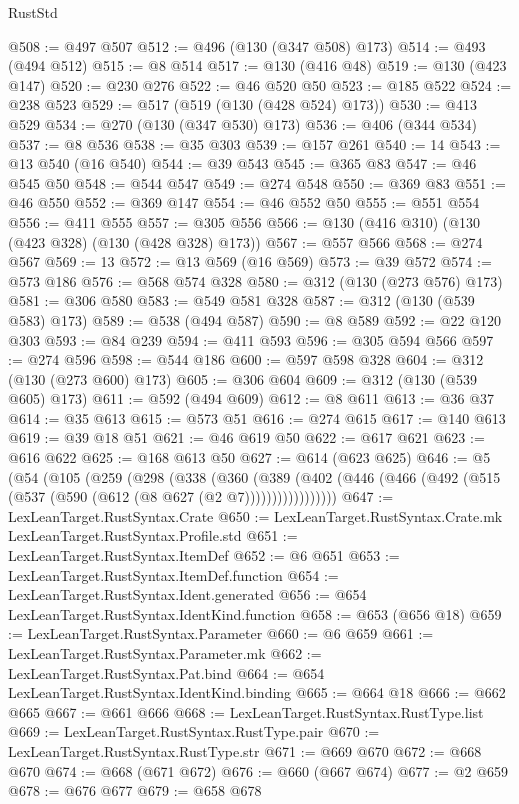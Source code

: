 \begin{lexlean}{RustStd}
\begin{coremodule}
{\begin{coremodule}
{{{{{{{{{{{{{{{{{{{{@508 := @497 @507
@512 := @496 (@130 (@347 @508) @173)
@514 := @493 (@494 @512)
@515 := @8 @514
@517 := @130 (@416 @48)
@519 := @130 (@423 @147)
@520 := @230 @276
@522 := @46 @520 @50
@523 := @185 @522
@524 := @238 @523
@529 := @517 (@519 (@130 (@428 @524) @173))
@530 := @413 @529
@534 := @270 (@130 (@347 @530) @173)
@536 := @406 (@344 @534)
@537 := @8 @536
@538 := @35 @303
@539 := @157 @261
@540 := 14
@543 := @13 @540 (@16 @540)
@544 := @39 @543
@545 := @365 @83
@547 := @46 @545 @50
@548 := @544 @547
@549 := @274 @548
@550 := @369 @83
@551 := @46 @550
@552 := @369 @147
@554 := @46 @552 @50
@555 := @551 @554
@556 := @411 @555
@557 := @305 @556
@566 := @130 (@416 @310) (@130 (@423 @328) (@130 (@428 @328) @173))
@567 := @557 @566
@568 := @274 @567
@569 := 13
@572 := @13 @569 (@16 @569)
@573 := @39 @572
@574 := @573 @186
@576 := @568 @574 @328
@580 := @312 (@130 (@273 @576) @173)
@581 := @306 @580
@583 := @549 @581 @328
@587 := @312 (@130 (@539 @583) @173)
@589 := @538 (@494 @587)
@590 := @8 @589
@592 := @22 @120 @303
@593 := @84 @239
@594 := @411 @593
@596 := @305 @594 @566
@597 := @274 @596
@598 := @544 @186
@600 := @597 @598 @328
@604 := @312 (@130 (@273 @600) @173)
@605 := @306 @604
@609 := @312 (@130 (@539 @605) @173)
@611 := @592 (@494 @609)
@612 := @8 @611
@613 := @36 @37
@614 := @35 @613
@615 := @573 @51
@616 := @274 @615
@617 := @140 @613
@619 := @39 @18 @51
@621 := @46 @619 @50
@622 := @617 @621
@623 := @616 @622
@625 := @168 @613 @50
@627 := @614 (@623 @625)
@646 := @5
    (@54
      (@105
        (@259
          (@298
            (@338
              (@360
                (@389
                  (@402 (@446 (@466 (@492 (@515 (@537 (@590 (@612 (@8 @627 (@2 @7)))))))))))))))))
@647 := LexLeanTarget.RustSyntax.Crate
@650 := LexLeanTarget.RustSyntax.Crate.mk LexLeanTarget.RustSyntax.Profile.std
@651 := LexLeanTarget.RustSyntax.ItemDef
@652 := @6 @651
@653 := LexLeanTarget.RustSyntax.ItemDef.function
@654 := LexLeanTarget.RustSyntax.Ident.generated
@656 := @654 LexLeanTarget.RustSyntax.IdentKind.function
@658 := @653 (@656 @18)
@659 := LexLeanTarget.RustSyntax.Parameter
@660 := @6 @659
@661 := LexLeanTarget.RustSyntax.Parameter.mk
@662 := LexLeanTarget.RustSyntax.Pat.bind
@664 := @654 LexLeanTarget.RustSyntax.IdentKind.binding
@665 := @664 @18
@666 := @662 @665
@667 := @661 @666
@668 := LexLeanTarget.RustSyntax.RustType.list
@669 := LexLeanTarget.RustSyntax.RustType.pair
@670 := LexLeanTarget.RustSyntax.RustType.str
@671 := @669 @670
@672 := @668 @670
@674 := @668 (@671 @672)
@676 := @660 (@667 @674)
@677 := @2 @659
@678 := @676 @677
@679 := @658 @678
}}}}}}}}}}}}}}}}}}}}
\end{coremodule}}
\end{coremodule}
\end{lexlean}
